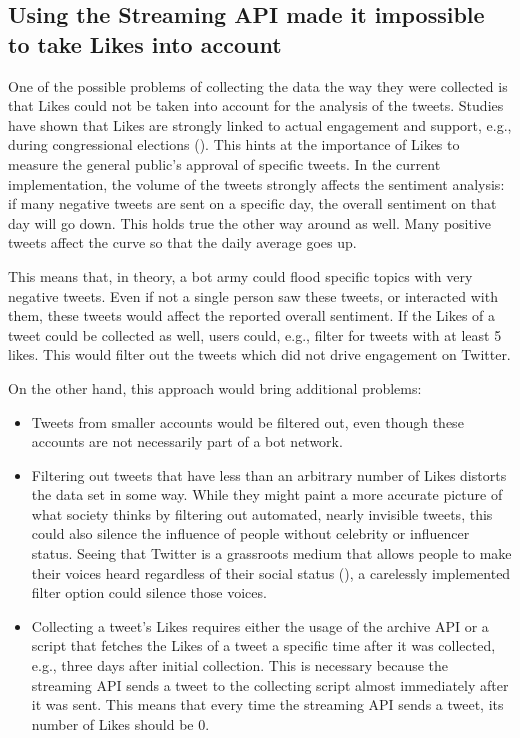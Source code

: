 \subsection*{Using the Streaming API made it impossible to take Likes into account}
One of the possible problems of collecting the data the way they were collected is that Likes could not be taken into account for the analysis of the tweets. Studies have shown that Likes are strongly linked to actual engagement and support, e.g., during congressional elections (\cite{macwilliamsForecastingCongressionalElections2015}). This hints at the importance of Likes to measure the general public's approval of specific tweets. In the current implementation, the volume of the tweets strongly affects the sentiment analysis: if many negative tweets are sent on a specific day, the overall sentiment on that day will go down. This holds true the other way around as well. Many positive tweets affect the curve so that the daily average goes up.

This means that, in theory, a bot army could flood specific topics with very negative tweets. Even if not a single person saw these tweets, or interacted with them, these tweets would affect the reported overall sentiment. If the Likes of a tweet could be collected as well, users could, e.g., filter for tweets with at least 5 likes. This would filter out the tweets which did not drive engagement on Twitter.

On the other hand, this approach would bring additional problems:
\begin{itemize}
    \item Tweets from smaller accounts would be filtered out, even though these accounts are not necessarily part of a bot network.
    \item Filtering out tweets that have less than an arbitrary number of Likes distorts the data set in some way. While they might paint a more accurate picture of what society thinks by filtering out automated, nearly invisible tweets, this could also silence the influence of people without celebrity or influencer status. Seeing that Twitter is a grassroots medium that allows people to make their voices heard regardless of their social status (\cite{passmann2019alte}), a carelessly implemented filter option could silence those voices.
    \item Collecting a tweet's Likes requires either the usage of the archive API or a script that fetches the Likes of a tweet a specific time after it was collected, e.g., three days after initial collection. This is necessary because the streaming API sends a tweet to the collecting script almost immediately after it was sent. This means that every time the streaming API sends a tweet, its number of Likes should be 0.
\end{itemize}

